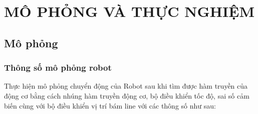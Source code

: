 \chapter{MÔ PHỎNG VÀ THỰC NGHIỆM}
     \section{Mô phỏng}
          \subsection{Thông số mô phỏng robot}
               \hspace*{0.6cm}Thực hiện mô phỏng chuyển động của Robot sau khi tìm được hàm truyền của động cơ bằng cách nhúng hàm truyền động cơ,
               bộ điều khiển tốc độ, sai số cảm biến cùng với bộ điều khiển vị trí bám line với các thông số như sau:
